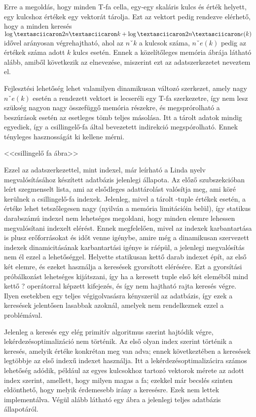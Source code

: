 Erre a megoldás, hogy minden T-fa cella, egy-egy skaláris kulcs és érték helyett, egy kulcshoz értékek egy vektorát tárolja.
Ezt az vektort pedig rendezve elérhető, hogy a minden keresés $\logˇ2{nˇk}+\logˇ2{nˇe(k)}$ idővel arányosan végrehajtható, ahol az $nˇk$ a kulcsok száma, $nˇe(k)$ pedig az értékek száma adott $k$ kulcs esetén.
Ennek a közelítőleges memória ábrája látható alább, amiből következik az elnevezése, miszerint ezt az adatszerkezetet  neveztem el.

Fejlesztési lehetőség lehet valamilyen dinamikusan változó szerkezet, amely nagy $nˇe(k)$ esetén a rendezett vektort is lecseréli egy T-fa szerkezetre, így nem lesz szükség nagyon nagy összefüggő memória részekre, és megsprórolható a beszúrások esetén az esetleges tömb teljes másolása. 
Itt a tárolt adatok mindig egyediek, így a csillingelő-fa által bevezetett indirekció megspórolható.
Ennek tényleges hasznosságát ki kellene mérni.

<<csillingelő fa ábra>>

Ezzel az adatszerkezettel, mint indexel, már leírható a Linda nyelv megvalósításához készített adatbázis jelenlegi állapota.
Az előző szubszekcióban leírt szegmenselt lista, ami az elsődleges adattárolást valósítja meg, ami köré kerülnek a csillingelő-fa indexek.
Jelenleg, mivel a tárolt -tuple értékek esetén, a  értéke lehet tetszőlegesen nagy (nyilván a memória limitációin belül), így statikus darabszámú indexel nem lehetséges megoldani, hogy minden elemre lehessen megvalósítani indexelt elérést.
Ennek megfelelően, mivel az indexek karbantartása is plusz erőforrásokat és időt venne igénybe, amire még a dinamikusan szervezett indexek dinamicitásának karbantartási igénye is ráépül, a jelenlegi megvalósítás nem él ezzel a lehetőséggel.
Helyette statikusan kettő darab indexet épít, az első két elemre, és ezeket használja a keresések gyorsított elérésére.
Ezt a gyorsítási próbálkozást lehetséges kijátszani, így ha a keresett tuple első két eleméből mind kettő ? operátorral képzett kifejezés, és így nem hajtható rajta keresés végre.
Ilyen esetekben egy teljes végigolvasásra kényszerül az adatbázis, így ezek a keresések jelentősen lasabbak azoknál, amelyek nem rendelkeznek ezzel a problémával.

Jelenleg a keresés egy elég primitív algoritmus szerint hajtódik végre, lekérdezésoptimalizáció nem történik.
Az első olyan index szerint történik a keresés, amelyik értéke konkrétan meg van adva; ennek következtében a keresések legtöbbje az első indexű indexet használja.
Itt a lekérdezésoptimalizácira számos lehetőség adódik, például az egyes kulcsokhoz tartozó vektorok mérete az adott index szerint, amellett, hogy milyen magas a fa; ezekkel már becslés szinten eldönthető, hogy melyik érdemesebb irány a keresésre.
Ezek nem lettek implementálva.
Végül alább látható egy ábra a jelenlegi teljes adatbázis állapotáról.


